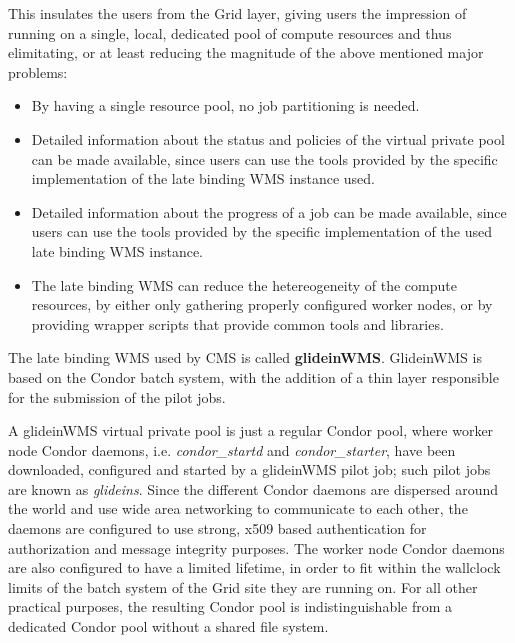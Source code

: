 \documentclass[a4paper]{jpconf}
\begin{document}
This insulates the users from the Grid layer, giving users
the impression of running on a single, local, dedicated pool of compute resources
and thus elimitating, or at least reducing the magnitude of the above mentioned major problems:
\begin {itemize}
\item 
By having a single resource pool, no job partitioning is needed.
\item
Detailed information about the status and policies of the virtual private pool can be made available, 
since users can use the tools provided by the specific implementation of the late binding WMS instance used.
\item 
Detailed information about the progress of a job can be made available,
since users can use the tools provided by the specific implementation of the used late binding WMS instance.
\item
The late binding WMS can reduce the hetereogeneity of the compute resources, 
by either only gathering properly configured worker nodes,
or by providing wrapper scripts that provide common tools and libraries.
\end{itemize}

The late binding WMS used by CMS is called \textbf{glideinWMS}. GlideinWMS is based on the Condor batch system, 
with the addition of a thin layer responsible for the submission of the pilot jobs.

A glideinWMS virtual private pool is just a regular Condor pool, 
where worker node Condor daemons, i.e. \emph{condor\_startd} and \emph{condor\_starter}, 
have been downloaded, configured and started by a glideinWMS pilot job; such pilot jobs are known as \emph{glideins}. 
Since the different Condor daemons are dispersed around the world and use wide area networking to communicate to each other,
the daemons are configured to use strong, x509 based authentication for authorization and message integrity purposes.
The worker node Condor daemons are also configured to have a limited lifetime, in order to fit within the wallclock limits 
of the batch system of the Grid site they are running on.
For all other practical purposes, the resulting Condor pool is indistinguishable from a dedicated Condor pool without a shared file system.
\end{document}
